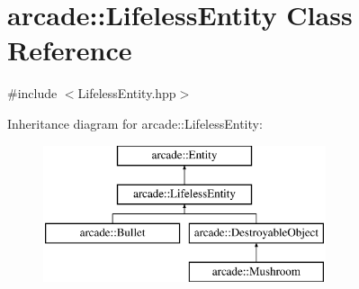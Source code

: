 \hypertarget{classarcade_1_1_lifeless_entity}{\section{arcade\-:\-:Lifeless\-Entity Class Reference}
\label{classarcade_1_1_lifeless_entity}
}


{\ttfamily \#include $<$Lifeless\-Entity.\-hpp$>$}

Inheritance diagram for arcade\-:\-:Lifeless\-Entity\-:\begin{figure}[H]
\begin{center}
\leavevmode
\includegraphics[height=4.000000cm]{classarcade_1_1_lifeless_entity}
\end{center}
\end{figure}
